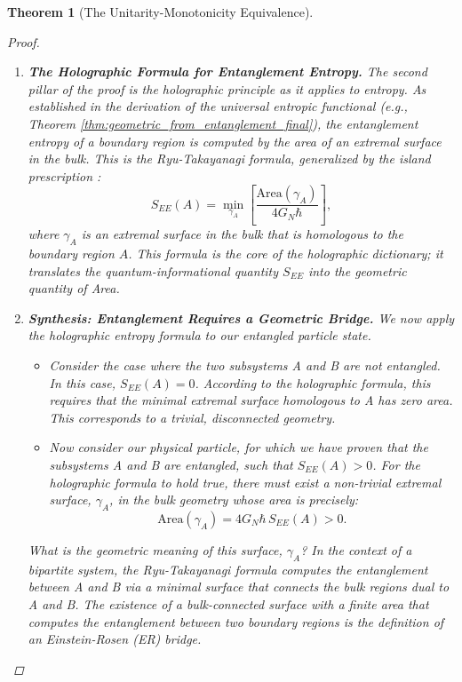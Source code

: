 \documentclass[11pt, letterpaper]{report}
\theoremstyle{plain} %
\newtheorem{theorem}{Theorem}[chapter]
\theoremstyle{definition} %
\theoremstyle{remark} %
\begin{document}
\begin{theorem}[The Unitarity-Monotonicity Equivalence]
\begin{proof}
\begin{enumerate}
    \item \textbf{The Holographic Formula for Entanglement Entropy.}
    The second pillar of the proof is the holographic principle as it applies to entropy. As established in the derivation of the universal entropic functional (e.g., Theorem \ref{thm:geometric_from_entanglement_final}), the entanglement entropy of a boundary region is computed by the area of an extremal surface in the bulk. This is the Ryu-Takayanagi formula, generalized by the island prescription \cite{Ryu2006Holographic,Almheiri2019Islands}:
    \begin{equation}
        S_{EE}(A) = \min_{\gamma_A} \left[ \frac{\text{Area}(\gamma_A)}{4 G_N \hbar} \right],
    \end{equation}
    where $\gamma_A$ is an extremal surface in the bulk that is homologous to the boundary region $A$. This formula is the core of the holographic dictionary; it translates the quantum-informational quantity $S_{EE}$ into the geometric quantity of Area.

    \item \textbf{Synthesis: Entanglement Requires a Geometric Bridge.}
    We now apply the holographic entropy formula to our entangled particle state.
    \begin{itemize}
        \item Consider the case where the two subsystems A and B are not entangled. In this case, $S_{EE}(A) = 0$. According to the holographic formula, this requires that the minimal extremal surface homologous to A has zero area. This corresponds to a trivial, disconnected geometry.
        
        \item Now consider our physical particle, for which we have proven that the subsystems A and B \textit{are} entangled, such that $S_{EE}(A) > 0$. For the holographic formula to hold true, there must exist a non-trivial extremal surface, $\gamma_A$, in the bulk geometry whose area is precisely:
        \begin{equation}
            \text{Area}(\gamma_A) = 4 G_N \hbar \, S_{EE}(A) > 0.
        \end{equation}
    \end{itemize}
    What is the geometric meaning of this surface, $\gamma_A$? In the context of a bipartite system, the Ryu-Takayanagi formula computes the entanglement between A and B via a minimal surface that connects the bulk regions dual to A and B. The existence of a bulk-connected surface with a finite area that computes the entanglement between two boundary regions is the \textit{definition} of an Einstein-Rosen (ER) bridge.


\end{enumerate}
\end{proof}
\end{theorem}
\end{document}

